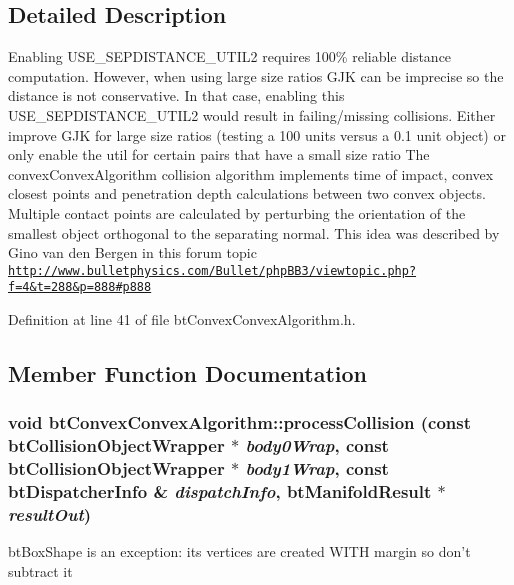 \subsection{Detailed Description}
Enabling USE\_\-SEPDISTANCE\_\-UTIL2 requires 100\% reliable distance computation. However, when using large size ratios GJK can be imprecise so the distance is not conservative. In that case, enabling this USE\_\-SEPDISTANCE\_\-UTIL2 would result in failing/missing collisions. Either improve GJK for large size ratios (testing a 100 units versus a 0.1 unit object) or only enable the util for certain pairs that have a small size ratio The convexConvexAlgorithm collision algorithm implements time of impact, convex closest points and penetration depth calculations between two convex objects. Multiple contact points are calculated by perturbing the orientation of the smallest object orthogonal to the separating normal. This idea was described by Gino van den Bergen in this forum topic \href{http://www.bulletphysics.com/Bullet/phpBB3/viewtopic.php?f=4&t=288&p=888#p888}{\tt http://www.bulletphysics.com/Bullet/phpBB3/viewtopic.php?f=4\&t=288\&p=888\#p888} 

Definition at line 41 of file btConvexConvexAlgorithm.h.

\subsection{Member Function Documentation}
\hypertarget{classbt_convex_convex_algorithm_b566631355a17f7a4bcbddf9454eb9e5}{
\subsubsection[processCollision]{\setlength{\rightskip}{0pt plus 5cm}void btConvexConvexAlgorithm::processCollision (const btCollisionObjectWrapper $\ast$ {\em body0Wrap}, \/  const btCollisionObjectWrapper $\ast$ {\em body1Wrap}, \/  const btDispatcherInfo \& {\em dispatchInfo}, \/  {\bf btManifoldResult} $\ast$ {\em resultOut})}}
\label{classbt_convex_convex_algorithm_b566631355a17f7a4bcbddf9454eb9e5}




btBoxShape is an exception: its vertices are created WITH margin so don't subtract it 

